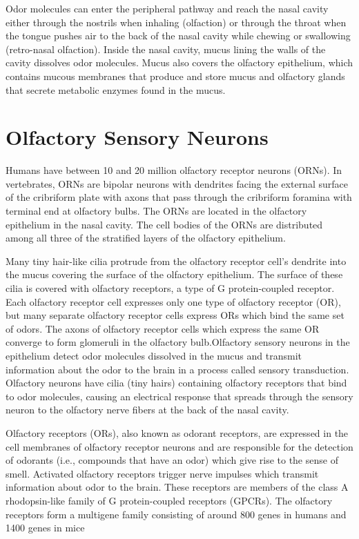 Odor molecules can enter the peripheral pathway and reach the nasal cavity either through the nostrils when inhaling (olfaction) or through the throat when the tongue pushes air to the back of the nasal cavity while chewing or swallowing (retro-nasal olfaction). Inside the nasal cavity, mucus lining the walls of the cavity dissolves odor molecules. Mucus also covers the olfactory epithelium, which contains mucous membranes that produce and store mucus and olfactory glands that secrete metabolic enzymes found in the mucus.

\hypertarget{olfactory-sensory-neurons}{%
\section{Olfactory Sensory Neurons}\label{olfactory-sensory-neurons}}

Humans have between 10 and 20 million olfactory receptor neurons (ORNs). In vertebrates, ORNs are bipolar neurons with dendrites facing the external surface of the cribriform plate with axons that pass through the cribriform foramina with terminal end at olfactory bulbs. The ORNs are located in the olfactory epithelium in the nasal cavity. The cell bodies of the ORNs are distributed among all three of the stratified layers of the olfactory epithelium.

Many tiny hair-like cilia protrude from the olfactory receptor cell's dendrite into the mucus covering the surface of the olfactory epithelium. The surface of these cilia is covered with olfactory receptors, a type of G protein-coupled receptor. Each olfactory receptor cell expresses only one type of olfactory receptor (OR), but many separate olfactory receptor cells express ORs which bind the same set of odors. The axons of olfactory receptor cells which express the same OR converge to form glomeruli in the olfactory bulb.Olfactory sensory neurons in the epithelium detect odor molecules dissolved in the mucus and transmit information about the odor to the brain in a process called sensory transduction. Olfactory neurons have cilia (tiny hairs) containing olfactory receptors that bind to odor molecules, causing an electrical response that spreads through the sensory neuron to the olfactory nerve fibers at the back of the nasal cavity.

Olfactory receptors (ORs), also known as odorant receptors, are expressed in the cell membranes of olfactory receptor neurons and are responsible for the detection of odorants (i.e., compounds that have an odor) which give rise to the sense of smell. Activated olfactory receptors trigger nerve impulses which transmit information about odor to the brain. These receptors are members of the class A rhodopsin-like family of G protein-coupled receptors (GPCRs). The olfactory receptors form a multigene family consisting of around 800 genes in humans and 1400 genes in mice

